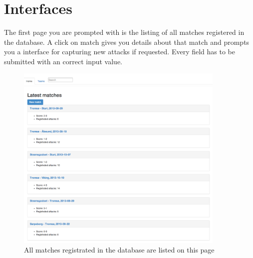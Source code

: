 
\section{Interfaces}

The first page you are prompted with is the listing of all matches registered in the database. A click on match gives you details about that match and prompts you a interface for capturing new attacks if requested. Every field has to be submitted with an correct input value.

\begin{figure}[ht!]
\centering
\includegraphics[width=100mm]{images/general/all_matches.png}
\caption{All matches registrated in the database are listed on this page}
\label{overflow}
\end{figure}
